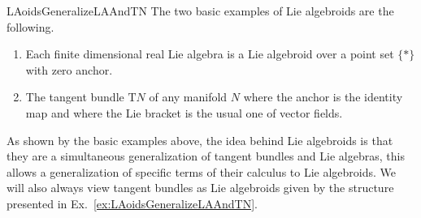 \begin{examples}{\cite[\S 16.2, page 114]{DaSilva}}{LAoidsGeneralizeLAAndTN}
The two basic examples of Lie algebroids are the following.
\begin{enumerate}
	\item Each finite dimensional real Lie algebra is a Lie algebroid over a point set $\{*\}$ with zero anchor.
	\item The tangent bundle $\mathrm{T}N$ of any manifold $N$ where the anchor is the identity map and where the Lie bracket is the usual one of vector fields.
\end{enumerate}
\end{examples}

As shown by the basic examples above, the idea behind Lie algebroids is that they are a simultaneous generalization of tangent bundles and Lie algebras, this allows a generalization of specific terms of their calculus to Lie algebroids. We will also always view tangent bundles as Lie algebroids given by the structure presented in Ex.~\ref{ex:LAoidsGeneralizeLAAndTN}.

